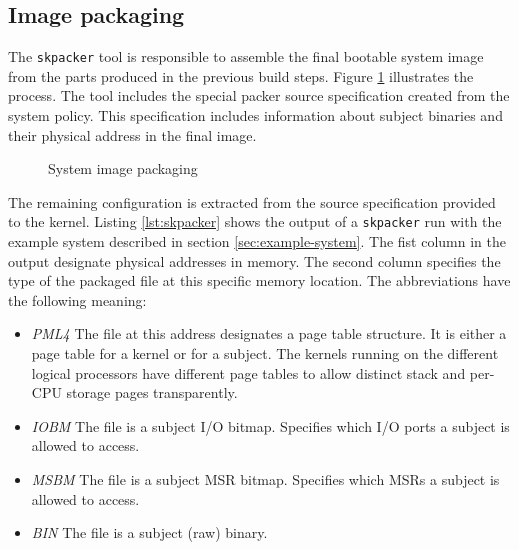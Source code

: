 \subsection{Image packaging}\label{subsec:image-packaging}
The \texttt{skpacker} tool is responsible to assemble the final bootable system
image from the parts produced in the previous build steps. Figure
\ref{fig:image-packaging} illustrates the process. The tool includes the special
packer source specification created from the system policy. This specification
includes information about subject binaries and their physical address in the
final image.

\begin{figure}[h]
	\centering
	
	\caption{System image packaging}
	\label{fig:image-packaging}
\end{figure}

The remaining configuration is extracted from the source specification provided
to the kernel. Listing \ref{lst:skpacker} shows the output of a
\texttt{skpacker} run with the example system described in section
\ref{sec:example-system}. The fist column in the output designate physical
addresses in memory. The second column specifies the type of the packaged file
at this specific memory location. The abbreviations have the following meaning:

\begin{itemize}
	\item \emph{PML4} The file at this address designates a page table
		structure. It is either a page table for a kernel or for a subject. The
		kernels running on the different logical processors have different page
		tables to allow distinct stack and per-CPU storage pages transparently.
	\item \emph{IOBM} The file is a subject I/O bitmap. Specifies which I/O
		ports a subject is allowed to access.
	\item \emph{MSBM} The file is a subject MSR bitmap. Specifies which MSRs a
		subject is allowed to access.
	\item \emph{BIN} The file is a subject (raw) binary.
\end{itemize}

